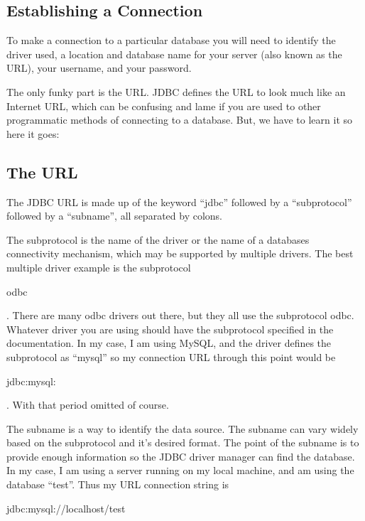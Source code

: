 \documentclass[11pt]{report}
\begin{document}
\begin{flushleft}
    \section{Establishing a Connection}
        To make a connection to a particular database you will need to
        identify the driver used, a location and database name for your server
        (also known as the URL), your username, and your password.  

        The only funky part is the URL.  JDBC defines the URL to look much
        like an Internet URL, which can be confusing and lame if you are used
        to other programmatic methods of connecting to a database.  But, we
        have to learn it so here it goes:

        \subsection{The URL}
           The JDBC URL is made up of the keyword ``jdbc'' 
           followed by a ``subprotocol'' followed by a ``subname'', all
           separated by colons.

           The subprotocol is the name of the driver or the name of a databases
           connectivity mechanism, which may be supported by multiple drivers.
           The best multiple driver example is the subprotocol
           \begin{slshape}odbc\end{slshape}.  There are many odbc drivers out
           there, but they all use the subprotocol odbc.  Whatever driver you
           are using should have the subprotocol specified in the
           documentation.  In my case, I am using MySQL, and the driver
           defines the subprotocol as ``mysql'' so my connection URL
           through this point would be
           \begin{bf}jdbc:mysql:\end{bf}.  With that period omitted
           of course.

           The subname is a way to identify the data source.  The subname can
           vary widely based on the subprotocol and it's desired format.  The
           point of the subname is to provide enough information so the JDBC
           driver manager can find the database.  In my case, I am using a
           server running on my local machine, and am using the database
           ``test''.  Thus my URL connection string is
           \begin{bf}jdbc:mysql://localhost/test\end{bf}


\end{flushleft}
\end{document}
